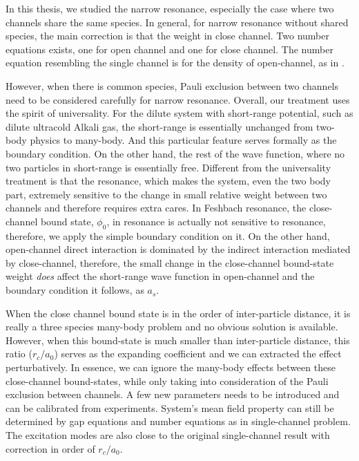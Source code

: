In this thesis, we studied the narrow resonance, especially the case where two channels share the same species.  In general, for narrow resonance without shared species, the main correction is that the weight in close channel.  Two number equations exists, one for open channel and one for close channel.  The number equation resembling the single channel is for the density of open-channel, as in  \cite{GurarieNarrow}.  

However, when there is common species,  Pauli exclusion between two channels need to be considered carefully for narrow resonance.  Overall, our treatment uses the spirit of universality.  For the dilute system with short-range potential, such as dilute ultracold Alkali gas, the short-range is essentially unchanged from two-body physics to many-body.  And this particular feature serves formally as the boundary condition.  On the other hand, the rest of the wave function, where no two particles in short-range is essentially free.  Different from the universality treatment is that the resonance, which makes the system, even the two body part, extremely sensitive to the change in small relative weight between two channels and therefore requires extra cares.  In Feshbach resonance, the close-channel bound state, $\phi_{0}$, in resonance is actually not sensitive to resonance, therefore, we apply the simple boundary condition on it. On the other hand, open-channel direct interaction is dominated by the indirect interaction mediated by close-channel, therefore, the small change in the close-channel bound-state weight \emph{does} affect the short-range wave function in open-channel and the boundary condition it follows, as $a_{s}$. 

When the close channel bound state is in the order of   inter-particle distance, it is really a three species many-body problem and no obvious solution is available.  However, when this bound-state is much smaller than inter-particle distance, this ratio ($r_{c}/a_{0}$) serves as the expanding coefficient and we can extracted the effect perturbatively.  In essence, we can ignore the many-body effects between these close-channel bound-states, while only taking into consideration of the Pauli exclusion between channels.  A few new parameters needs to be introduced and can be calibrated from experiments.  System's mean field property can still be determined by gap equations and number equations as in single-channel problem.  The excitation modes are also close to the original single-channel result with correction in order of $r_{c}/a_{0}$.